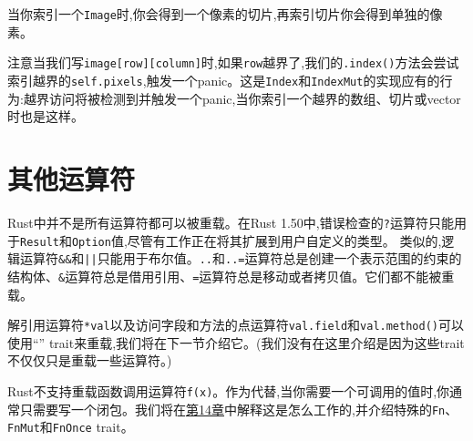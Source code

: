 当你索引一个\texttt{Image}时,你会得到一个像素的切片,再索引切片你会得到单独的像素。

注意当我们写\texttt{image[row][column]}时,如果\texttt{row}越界了,我们的\texttt{.index()}方法会尝试索引越界的\texttt{self.pixels},触发一个panic。这是\texttt{Index}和\texttt{IndexMut}的实现应有的行为:越界访问将被检测到并触发一个panic,当你索引一个越界的数组、切片或vector时也是这样。

\section{其他运算符}

Rust中并不是所有运算符都可以被重载。在Rust 1.50中,错误检查的\texttt{?}运算符只能用于\texttt{Result}和\texttt{Option}值,尽管有工作正在将其扩展到用户自定义的类型。 类似的,逻辑运算符\texttt{\&\&}和\texttt{||}只能用于布尔值。\texttt{..}和\texttt{..=}运算符总是创建一个表示范围的约束的结构体、\texttt{\&}运算符总是借用引用、\texttt{=}运算符总是移动或者拷贝值。它们都不能被重载。

解引用运算符\texttt{*val}以及访问字段和方法的点运算符\texttt{val.field}和\texttt{val.method()}可以使用“” trait来重载,我们将在下一节介绍它。(我们没有在这里介绍是因为这些trait不仅仅只是重载一些运算符。)

Rust不支持重载函数调用运算符\texttt{f(x)}。作为代替,当你需要一个可调用的值时,你通常只需要写一个闭包。我们将在\hyperref[ch14]{第14章}中解释这是怎么工作的,并介绍特殊的\texttt{Fn}、\texttt{FnMut}和\texttt{FnOnce} trait。
